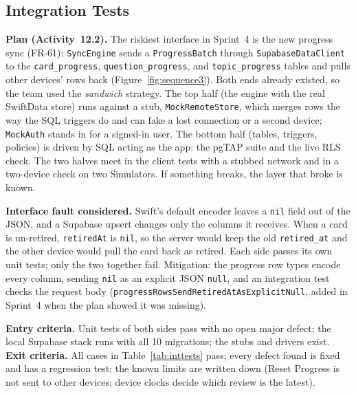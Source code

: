 \documentclass[12pt,letterpaper]{article}
\begin{document}
\subsection{Integration Tests}\label{sec:integration}
\textbf{Plan (Activity~12.2).} The riskiest interface in Sprint~4 is the new progress
sync (FR-61): \texttt{SyncEngine} sends a \texttt{ProgressBatch} through
\texttt{SupabaseDataClient} to the \texttt{card\_progress},
\texttt{question\_progress}, and \texttt{topic\_progress} tables and pulls other
devices' rows back (Figure~\ref{fig:sequence3}). Both ends already existed, so the
team used the \emph{sandwich} strategy. The top half (the engine with the real
SwiftData store) runs against a stub, \texttt{MockRemoteStore}, which merges rows the
way the SQL triggers do and can fake a lost connection or a second device;
\texttt{MockAuth} stands in for a signed-in user. The bottom half (tables, triggers,
policies) is driven by SQL acting as the app: the pgTAP suite and the live RLS check.
The two halves meet in the client tests with a stubbed network and in a two-device
check on two Simulators. If something breaks, the layer that broke is known.

\textbf{Interface fault considered.} Swift's default encoder leaves a \texttt{nil}
field out of the JSON, and a Supabase upsert changes only the columns it receives.
When a card is un-retired, \texttt{retiredAt} is \texttt{nil}, so the server would keep
the old \texttt{retired\_at} and the other device would pull the card back as retired.
Each side passes its own unit tests; only the two together fail. Mitigation: the
progress row types encode every column, sending \texttt{nil} as an explicit JSON
\texttt{null}, and an integration test checks the request body
(\texttt{progressRowsSendRetiredAtAsExplicitNull}, added in Sprint~4 when the plan
showed it was missing).

\textbf{Entry criteria.} Unit tests of both sides pass with no open major defect; the
local Supabase stack runs with all 10 migrations; the stubs and drivers exist.
\textbf{Exit criteria.} All cases in Table~\ref{tab:inttests} pass; every defect found
is fixed and has a regression test; the known limits are written down (Reset Progress
is not sent to other devices; device clocks decide which review is the latest).
\end{document}
